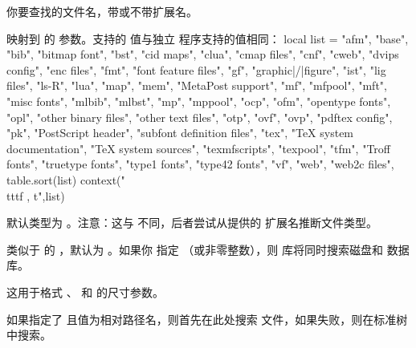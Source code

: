 \begin{itemize}


你要查找的文件名，带或不带扩展名。


映射到 \KPSEWHICH 的  参数。支持的 
值与独立  程序支持的值相同：\startluacode
    local list = {
        "afm",
        "base",
        "bib",
        "bitmap font",
        "bst",
        "cid maps",
        "clua",
        "cmap files",
        "cnf",
        "cweb",
        "dvips config",
        "enc files",
        "fmt",
        "font feature files",
        "gf",
        "graphic|/|figure",
        "ist",
        "lig files",
        "ls-R",
        "lua",
        "map",
        "mem",
        "MetaPost support",
        "mf",
        "mfpool",
        "mft",
        "misc fonts",
        "mlbib",
        "mlbst",
        "mp",
        "mppool",
        "ocp",
        "ofm",
        "opentype fonts",
        "opl",
        "other binary files",
        "other text files",
        "otp",
        "ovf",
        "ovp",
        "pdftex config",
        "pk",
        "PostScript header",
        "subfont definition files",
        "tex",
        "TeX system documentation",
        "TeX system sources",
        "texmfscripts",
        "texpool",
        "tfm",
        "Troff fonts",
        "truetype fonts",
        "type1 fonts",
        "type42 fonts",
        "vf",
        "web",
        "web2c files",
    }
    table.sort(list)
    context("{\\tttf {}, t}",list)
\stopluacode

默认类型为 。注意：这与 \KPSEWHICH 不同，后者尝试从提供的
扩展名推断文件类型。


类似于 \KPSEWHICH 的 ，默认为 。如果你
指定 （或非零整数），则 \KPSE 库将同时搜索磁盘和 
数据库。


这用于格式 、 和  的尺寸参数。
\end{itemize}

如果指定了  且值为相对路径名，则首先在此处搜索
文件，如果失败，则在标准树中搜索。

\subsection{}

